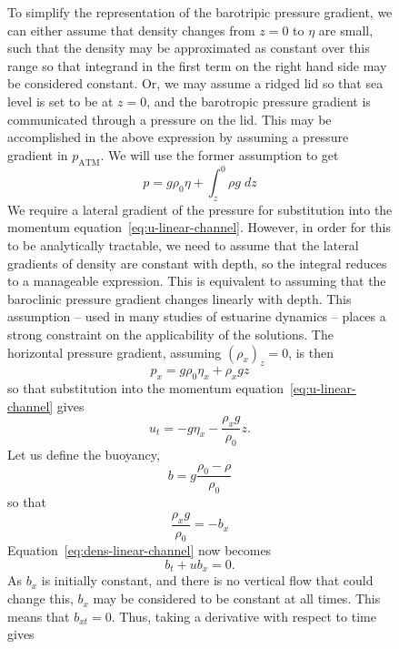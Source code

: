 \documentclass[11pt]{report}
\numberwithin{equation}{section}
\begin{document}
\begin{figure}
To simplify the representation of the barotripic pressure gradient, we can either assume that density changes from $z=0$ to $\eta$ are small, such that the density may be approximated as constant over this range so that integrand in the first term on the right hand side may be considered constant.  Or, we may assume a ridged lid so that sea level is set to be at $z=0$, and the barotropic pressure gradient is communicated through a pressure on the lid.  This may be accomplished in the above expression by assuming a pressure gradient in $p_{\mathrm{ATM}}$.  We will use the former assumption to get
\begin{equation}
    p = g \rho_0 \eta + \int_z^0 \rho g\;dz
\end{equation}
We require a lateral gradient of the pressure for substitution into the momentum equation~\ref{eq:u-linear-channel}.  However, in order for this to be analytically tractable, we need to assume that the lateral gradients of density are constant with depth, so the integral reduces to a manageable expression.  This is equivalent to assuming that the baroclinic pressure gradient changes linearly with depth.  This assumption -- used in many studies of estuarine dynamics -- places a strong constraint on the applicability of the solutions.  The horizontal pressure gradient, assuming $(\rho_x)_z = 0$, is then
\begin{equation}
    p_x = g \rho_0 \eta_x + \rho_x g z
\end{equation}
so that substitution into the momentum equation~\ref{eq:u-linear-channel} gives
\begin{equation}
    \label{eq:linear-channel-u_t}
    u_t =  -g \eta_x - \frac{\rho_x g}{\rho_0} z.
\end{equation}
Let us define the buoyancy,
\begin{equation}
    b = g\frac{\rho_0 - \rho}{\rho_0}
\end{equation}
so that
\begin{equation}
    \frac{\rho_x g}{\rho_0} = -b_x
\end{equation}
Equation~\ref{eq:dens-linear-channel} now becomes
\begin{equation}
    \label{eq:linear-channel-buoyancy}
    b_t + u b_x = 0.
\end{equation}
As $b_x$ is initially constant, and there is no vertical flow that could change this, $b_x$ may be considered to be constant at all times.  This means that $b_{xt} = 0$.  Thus, taking a derivative with respect to time gives
\begin{equation}

\end{equation}
\end{figure}
\end{document}
